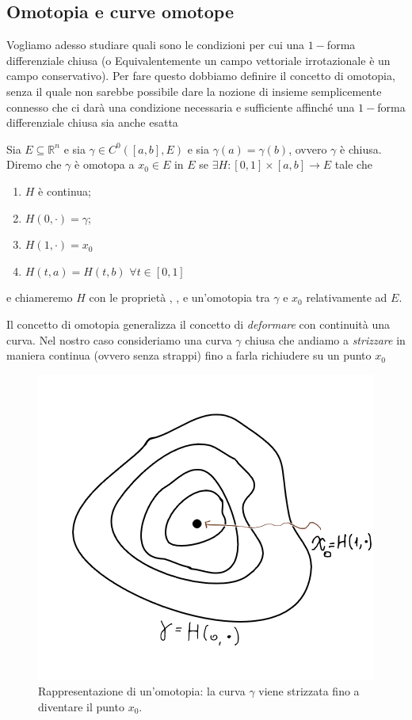 \subsection{Omotopia e curve omotope}
Vogliamo adesso studiare quali sono le condizioni per cui una $1-$forma differenziale chiusa (o Equivalentemente un campo vettoriale irrotazionale è un campo conservativo). Per fare questo dobbiamo definire
il concetto di omotopia, senza il quale non sarebbe possibile dare la nozione di insieme semplicemente connesso che ci darà una condizione necessaria e sufficiente affinché una $1-$forma differenziale chiusa sia anche esatta
\begin{definition}[omotopia]
	Sia $E \subseteq \mathbb{R}^n$ e sia $\gamma \in C^0([a, b], E)$ e sia $\gamma(a) = \gamma(b)$, ovvero $\gamma$ è chiusa. Diremo che $\gamma$
	è omotopa a $x_0 \in E$ in $E$ se $\exists H:[0,1] \times [a, b] \to E$ tale che
	\begin{enumerate}[label=\protect\circled{\arabic*}]
		\item $H$ è continua;
		\item $H(0, \cdot) = \gamma$;
		\item $H(1, \cdot) = x_0$
		\item $H(t, a) = H(t, b) \, \, \forall t \in [0, 1]$
	\end{enumerate}
	e chiameremo $H$ con le proprietà , ,  e  un'omotopia tra $\gamma$ e $x_0$ relativamente ad $E$.
\end{definition}
Il concetto di omotopia generalizza il concetto di \emph{deformare} con continuità una curva. Nel nostro caso consideriamo una curva $\gamma$ chiusa che andiamo a \emph{strizzare} in maniera continua (ovvero senza strappi) fino a farla richiudere su un punto $x_0$
\begin{figure}[htbp]
	\centering
	\includegraphics{immagini/omotopia.png}
	\caption{Rappresentazione di un'omotopia: la curva $\gamma$ viene strizzata fino a diventare il punto $x_0$.}
\end{figure}
